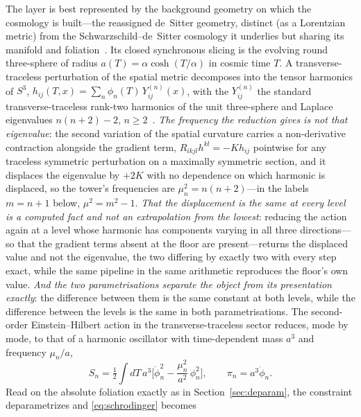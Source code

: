 \documentclass[11pt,a4paper]{article}
\theoremstyle{plain}
\theoremstyle{definition}
\theoremstyle{remark}
\begin{document}
The layer is best represented by the background geometry on which the cosmology is built---the reassigned de~Sitter geometry, distinct (as a Lorentzian metric) from the Schwarzschild--de~Sitter cosmology it underlies but sharing its manifold and foliation~\cite{JanzenCRframework}. Its closed synchronous slicing is the evolving round three-sphere of radius $a(T)=\alpha\cosh(T/\alpha)$ in cosmic time $T$. A transverse-traceless perturbation of the spatial metric decomposes into the tensor harmonics of $S^3$, $h_{ij}(T,x)=\sum_n \phi_n(T)\,Y^{(n)}_{ij}(x)$, with the $Y^{(n)}_{ij}$ the standard transverse-traceless rank-two harmonics of the unit three-sphere and Laplace eigenvalues $n(n+2)-2$, $n\ge 2$~\cite{RubinOrdonez1984}.  \emph{The frequency the reduction gives is not that eigenvalue}: the second variation of the spatial curvature carries a non-derivative contraction alongside the gradient term, $R_{ikjl}h^{kl}=-K h_{ij}$ pointwise for any traceless symmetric perturbation on a maximally symmetric section, and it displaces the eigenvalue by $+2K$ with no dependence on which harmonic is displaced, so the tower's frequencies are $\mu_n^2=n(n+2)$---in the labels $m=n+1$ below, $\mu^{2}=m^{2}-1$.  \emph{That the displacement is the same at every level is a computed fact and not an extrapolation from the lowest}: reducing the action again at a level whose harmonic has components varying in all three directions---so that the gradient terms absent at the floor are present---returns the displaced value and not the eigenvalue, the two differing by exactly two with every step exact, while the same pipeline in the same arithmetic reproduces the floor's own value.  \emph{And the two parametrisations separate the object from its presentation exactly}: the difference between them is the same constant at both levels, while the difference between the levels is the same in both parametrisations. The second-order Einstein--Hilbert action in the transverse-traceless sector reduces, mode by mode, to that of a harmonic oscillator with time-dependent mass $a^3$ and frequency $\mu_n/a$,
\begin{equation}
S_n=\tfrac12\!\int\! dT\,a^3\Big[\dot\phi_n^2-\frac{\mu_n^2}{a^2}\,\phi_n^2\Big],
\qquad \pi_n=a^3\dot\phi_n .
\label{eq:tt-action}
\end{equation}
Read on the absolute foliation exactly as in Section~\ref{sec:deparam}, the constraint deparametrizes and \eqref{eq:schrodinger} becomes
\end{document}
